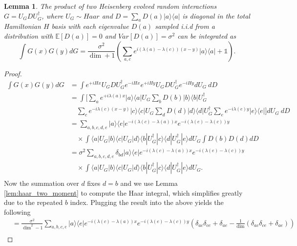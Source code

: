 \documentclass{article}
\newtheorem{lemma}[theorem]{Lemma}
\newcommand{\ket}[1]{|#1\rangle}
\newcommand{\bra}[1]{\langle #1|}
\newcommand{\ketbra}[2]{| #1\rangle\! \langle #2|}
\newcommand{\parens}[1]{\left( #1 \right)}
\newcommand{\brackets}[1]{\left[ #1 \right]}
\newcommand{\expect}[1]{\mathbb{E}\brackets{#1}}
\newcommand{\variance}[1]{\textit{Var} \brackets{ #1 }}
\newcommand{\identity}{\mathds{1}}
\begin{document}
\begin{lemma} \label{lem:two_heisenberg_interactions}
    The product of two Heisenberg evolved random interactions $G = U_G D U_G^\dagger$, where $U_G \sim Haar$ and $D = \sum_a D(a) \ketbra{a}{a}$ is diagonal in the total Hamiltonian $H$ basis with each eigenvalue $D(a)$ sampled i.i.d from a distribution with $\expect{D(a)} = 0$ and $\variance{D(a)} = \sigma^2$ can be integrated as
    \begin{equation}
        \int G(x) G(y) dG = \frac{\sigma^2}{\dim + 1} \parens{\sum_{a,c} e^{i (\lambda(a) - \lambda(c))(x-y)} \ketbra{a}{a} + \identity}.
    \end{equation}
\end{lemma}
\begin{proof}
    \begin{align}
        \int G(x) G(y) dG &= \int e^{+i H x} U_G D U_G^\dagger e^{-i H x} e^{+i H y} U_G D U_G^\dagger e^{-i H y} dU_G ~dD \\
        &= \int \bigg[\sum_a e^{+i \lambda(a)x}\ketbra{a}{a}  U_G \sum_b D(b)\ketbra{b}{b} U_G^\dagger \nonumber \\
        &\quad \sum_c e^{-i \lambda(c) (x - y)} \ketbra{c}{c} U_G \sum_d D(d)\ketbra{d}{d} U_G^\dagger \sum_e e^{-i \lambda(e) y} \ketbra{e}{e} \bigg] dU_G ~dD\\
        &=\sum_{a,b,c,d,e} \ketbra{a}{e} e^{-i (\lambda(c) - \lambda(a))x} e^{-i (\lambda(e) - \lambda(c))y} \nonumber \\
        &\quad \times \int \bra{a} U_G \ket{b} \bra{c} U_G \ket{d} \bra{b} U_G^{\dagger} \ket{c} \bra{d} U_G^\dagger \ket{e} dU_G \int D(b) D(d) dD \\
        &= \sigma^2 \sum_{a, b, c, d, e} \delta_{bd} \ketbra{a}{e} e^{-i (\lambda(c) - \lambda(a))x} e^{-i (\lambda(e) - \lambda(c))y} \nonumber \\
        &\quad \times \int \bra{a} U_G \ket{b} \bra{c} U_G \ket{d} \bra{b} U_G^{\dagger} \ket{c} \bra{d} U_G^\dagger \ket{e} dU_G. \\
    \end{align}
    Now the summation over $d$ fixes $d=b$ and we use Lemma \ref{lem:haar_two_moment} to compute the Haar integral, which simplifies greatly due to the repeated $b$ index. Plugging the result into the above yields the following
    \begin{align}
        &= \frac{\sigma^2}{\dim^2 - 1} \sum_{a, b, c, e} \ketbra{a}{e} e^{-i (\lambda(c) - \lambda(a))x} e^{-i (\lambda(e) - \lambda(c))y} \parens{\delta_{ac} \delta_{ce} + \delta_{ae} - \frac{1}{\dim} \parens{\delta_{ac} \delta_{ce} + \delta_{ae}}}  \\

\end{align}
\end{proof}
\end{document}
